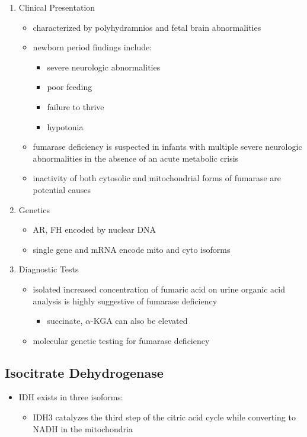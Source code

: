 \documentclass{scrartcl}
\begin{document}
\begin{enumerate}
\item Clinical Presentation
\label{sec:org00107f3}
\begin{itemize}
\item characterized by polyhydramnios and fetal brain abnormalities
\item newborn period findings include:
\begin{itemize}
\item severe neurologic abnormalities
\item poor feeding
\item failure to thrive
\item hypotonia
\end{itemize}
\item fumarase deficiency is suspected in infants with multiple severe
neurologic abnormalities in the absence of an acute metabolic crisis
\item inactivity of both cytosolic and mitochondrial forms of fumarase are
potential causes
\end{itemize}
\item Genetics
\label{sec:org942195b}
\begin{itemize}
\item AR, FH encoded by nuclear DNA
\item single gene and mRNA encode mito and cyto isoforms
\end{itemize}
\item Diagnostic Tests
\label{sec:orga32abbf}
\begin{itemize}
\item isolated increased concentration of fumaric acid on urine organic
acid analysis is highly suggestive of fumarase deficiency
\begin{itemize}
\item succinate, \(\alpha\)-KGA can also be elevated
\end{itemize}
\item molecular genetic testing for fumarase deficiency
\end{itemize}
\end{enumerate}
\subsection{Isocitrate Dehydrogenase}
\label{sec:orgd30966e}
\begin{itemize}
\item IDH exists in three isoforms:
\begin{itemize}
\item IDH3 catalyzes the third step of the citric acid cycle while
converting  to NADH in the mitochondria
\end{itemize}
\end{itemize}
\end{document}

